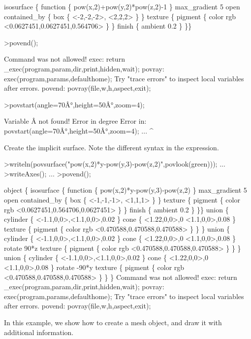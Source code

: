 \documentclass[a4paper,10pt]{article}
\begin{document}
\begin{eulernotebook}
\begin{euleroutput}
  isosurface \{
  function \{ pow(x,2)+pow(y,2)*pow(z,2)-1 \}
  max_gradient 5
  open
  contained_by \{ box \{ <-2,-2,-2>, <2,2,2>
   \} \}
   texture \{ pigment \{ color rgb <0.0627451,0.0627451,0.564706> \}  \} 
   finish \{ ambient 0.2 \} 
  \}\}
\end{euleroutput}
\begin{eulerprompt}
>povend();
\end{eulerprompt}
\begin{euleroutput}
  Command was not allowed!
  exec:
      return _exec(program,param,dir,print,hidden,wait);
  povray:
      exec(program,params,defaulthome);
  Try "trace errors" to inspect local variables after errors.
  povend:
      povray(file,w,h,aspect,exit); 
\end{euleroutput}
\begin{eulerprompt}
>povstart(angle=70Â°,height=50Â°,zoom=4);
\end{eulerprompt}
\begin{euleroutput}
  Variable Â not found!
  Error in degree
  Error in:
  povstart(angle=70Â°,height=50Â°,zoom=4); ...
                     ^
\end{euleroutput}
\begin{eulercomment}
Create the implicit surface. Note the different syntax in the
expression.
\end{eulercomment}
\begin{eulerprompt}
>writeln(povsurface("pow(x,2)*y-pow(y,3)-pow(z,2)",povlook(green))); ...
>writeAxes(); ...
>povend();
\end{eulerprompt}
\begin{euleroutput}
  object \{
  isosurface \{
  function \{ pow(x,2)*y-pow(y,3)-pow(z,2) \}
  max_gradient 5
  open
  contained_by \{ box \{ <-1,-1,-1>, <1,1,1>
   \} \}
   texture \{ pigment \{ color rgb <0.0627451,0.564706,0.0627451> \}  \} 
   finish \{ ambient 0.2 \} 
  \}\}
  union \{
    cylinder \{ <-1.1,0,0>,<1.1,0,0>,0.02 \}
    cone \{ 
      <1.22,0,0>,0
      <1.1,0,0>,0.08
    \}
    texture \{ pigment \{ color rgb <0.470588,0.470588,0.470588> \} \}
  \}
  union \{
    cylinder \{ <-1.1,0,0>,<1.1,0,0>,0.02 \}
    cone \{ 
      <1.22,0,0>,0
      <1.1,0,0>,0.08
    \}
    rotate 90*z
    texture \{ pigment \{ color rgb <0.470588,0.470588,0.470588> \} \}
  \}
  union \{
    cylinder \{ <-1.1,0,0>,<1.1,0,0>,0.02 \}
    cone \{ 
      <1.22,0,0>,0
      <1.1,0,0>,0.08
    \}
    rotate -90*y
    texture \{ pigment \{ color rgb <0.470588,0.470588,0.470588> \} \}
  \}
  Command was not allowed!
  exec:
      return _exec(program,param,dir,print,hidden,wait);
  povray:
      exec(program,params,defaulthome);
  Try "trace errors" to inspect local variables after errors.
  povend:
      povray(file,w,h,aspect,exit); 
\end{euleroutput}
\begin{eulercomment}
In this example, we show how to create a mesh object, and draw it with additional information.


\end{eulercomment}
\end{eulernotebook}
\end{document}
